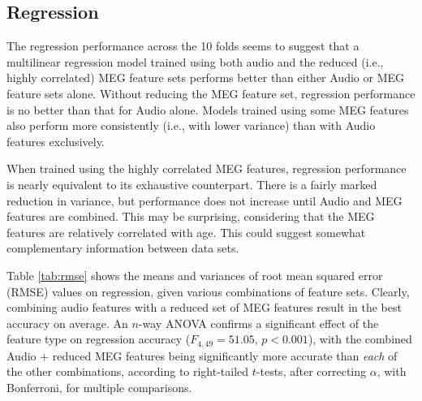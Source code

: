 \documentclass[utf8]{frontiersSCNS} %
\begin{document}
\subsection{Regression}

The regression performance across the 10 folds seems to suggest that a multilinear regression model trained using both audio and the reduced (i.e., highly correlated) MEG feature sets performs better than either Audio or MEG feature sets alone. Without  reducing the MEG feature set, regression performance is no better than that for Audio alone. Models trained using some MEG features also  perform more consistently (i.e., with lower variance) than with Audio features exclusively.

When trained using the highly correlated MEG features, regression performance is nearly equivalent to its exhaustive counterpart. There is a fairly marked reduction in variance, but performance does not increase until Audio and MEG features are combined. This may be surprising, considering that the MEG features are relatively correlated with age. This could suggest somewhat complementary information between data sets. %

Table \ref{tab:rmse} shows the means and variances of root mean squared error (RMSE) values on regression, given various combinations of feature sets. Clearly, combining audio features with a reduced set of MEG features result in the best accuracy on average. An $n$-way ANOVA confirms a significant effect of the feature type on regression accuracy ($F_{4,49} = 51.05$, $p<0.001$), with the combined Audio + reduced MEG features being significantly more accurate than {\em each} of the other combinations, according to right-tailed $t$-tests, after correcting $\alpha$, with Bonferroni, for multiple comparisons.


\end{document}
